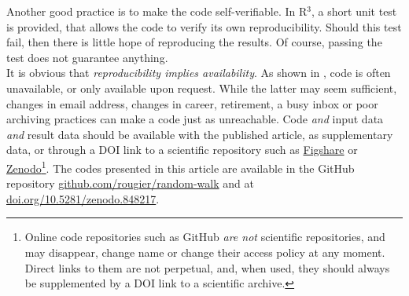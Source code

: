 \documentclass[a4paper,11pt]{article}
\begin{document}
Another good practice is to make the code self-verifiable. In R$^3$, a short unit test is provided, that allows the code to verify its own reproducibility. Should this test fail, then there is little hope of reproducing the results. Of course, passing the test does not guarantee anything.\\

It is obvious that \emph{reproducibility implies availability}. As shown in \citep{Collberg:2016}, code is often unavailable, or only available upon request. While the latter may seem sufficient, changes in email address, changes in career, retirement, a busy inbox or poor archiving practices can make a code just as unreachable. Code \emph{and} input data \emph{and} result data should be available with the published article, as supplementary data, or through a DOI link to a scientific repository such as \href{https://figshare.com}{Figshare} or \href{https://zenodo.org}{Zenodo}\footnote{Online code repositories such as GitHub \emph{are not} scientific repositories, and may disappear, change name or change their access policy at any moment. Direct links to them are not perpetual, and, when used, they should always be supplemented by a DOI link to a scientific archive.}. The codes presented in this article are available in the GitHub repository \href{https://github.com/rougier/random-walk}{github.com/rougier/random-walk} and at \href{https://doi.org/10.5281/zenodo.848217}{doi.org/10.5281/zenodo.848217}.\\
\end{document}
